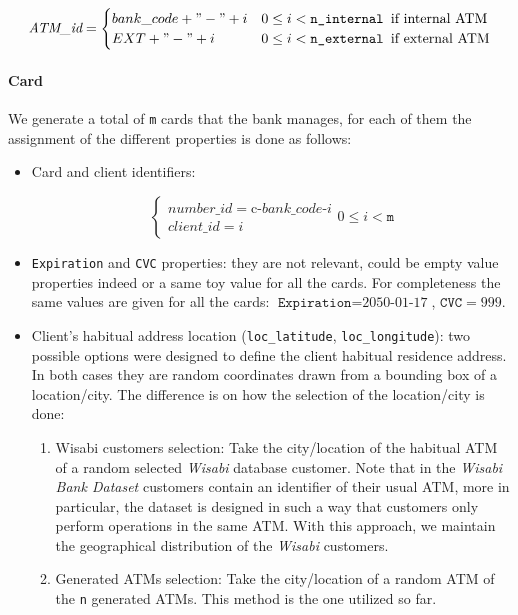 \[
\emph{ATM\_id} =
\begin{cases} 
bank\_code + "-" + i & 0 \leq i < \texttt{n\_internal } \text{if internal ATM}  \\
EXT + "-" + i & 0 \leq i < \texttt{n\_external } \text{if external ATM}
\end{cases}
\]

\paragraph*{Card}

We generate a total of \texttt{m} cards that the bank manages, for each of them the assignment of the different properties is done as follows:

\begin{itemize}
\item Card and client identifiers:

\[
\begin{cases} 
number\_id = \text{c-}bank\_code\text{-}i \\
client\_id = i 
\end{cases}
0 \leq i < \texttt{m}
\]

\item \texttt{Expiration} and \texttt{CVC} properties: they are not relevant, could be empty 
  value properties indeed or a same toy value for all the cards. For completeness the  
  same values are given for all the cards: $\texttt{Expiration} = \text{2050-01-17}$, $\texttt{CVC} = 999$.

\item Client's habitual address location (\texttt{loc\_latitude}, \texttt{loc\_longitude}): two possible options were designed to define the client habitual residence address. In both 
cases they are random 
coordinates drawn from a bounding box of a location/city. The difference is on how the selection of the location/city is done:

  \begin{enumerate}
      \item Wisabi customers selection: Take the city/location of the habitual ATM of a random selected \emph{Wisabi} database customer. Note that in the \emph{Wisabi Bank Dataset} customers contain an identifier
      of their usual ATM, more in particular, the dataset is designed in such a way that customers
      only perform operations in the same ATM.
      With this approach, we maintain the geographical distribution of the \emph{Wisabi} customers.
      \item Generated ATMs selection: Take the city/location of a random ATM of the \texttt{n} generated ATMs. This method is the one utilized so far.
  \end{enumerate}


\end{itemize}
